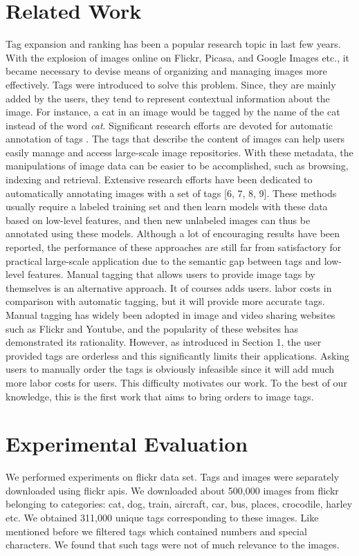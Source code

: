 \documentclass[12pt]{article}
\begin{document}
\section{Related Work}
Tag expansion and ranking has been a popular research topic in last few years. With the explosion of
images online on Flickr, Picasa, and Google Images etc., it became necessary to devise means of
organizing and managing images more effectively. Tags were introduced to solve this problem. Since,
they are mainly added by the users, they tend to represent contextual information about the image.
For instance, a cat in an image would be tagged by the name of the cat instead of the word \emph{cat}.
Significant research efforts are devoted for automatic annotation of tags . 
The tags that describe the content of images can help
users easily manage and access large-scale image repositories.
With these metadata, the manipulations of image data
can be easier to be accomplished, such as browsing, indexing
and retrieval. Extensive research efforts have been dedicated
to automatically annotating images with a set of tags [6, 7,
8, 9]. These methods usually require a labeled training set
and then learn models with these data based on low-level features,
and then new unlabeled images can thus be annotated
using these models. Although a lot of encouraging results
have been reported, the performance of these approaches
are still far from satisfactory for practical large-scale application
due to the semantic gap between tags and low-level
features. Manual tagging that allows users to provide image
tags by themselves is an alternative approach. It of courses
adds users. labor costs in comparison with automatic tagging,
but it will provide more accurate tags. Manual tagging
has widely been adopted in image and video sharing websites
such as Flickr and Youtube, and the popularity of these
websites has demonstrated its rationality. However, as introduced
in Section 1, the user provided tags are orderless
and this significantly limits their applications. Asking users
to manually order the tags is obviously infeasible since it
will add much more labor costs for users. This difficulty
motivates our work. To the best of our knowledge, this is
the first work that aims to bring orders to image tags.

\section{Experimental Evaluation}
We performed experiments on flickr data set. Tags and images were separately downloaded using
flickr apis. We downloaded about 500,000 images from flickr belonging to categories: cat,
dog, train, aircraft, car, bus, places, crocodile, harley etc. We obtained 311,000 unique tags
corresponding to these images. Like mentioned before we filtered tags which contained numbers
and special characters. We found that such tags were not of much relevance to the images.
\end{document}
